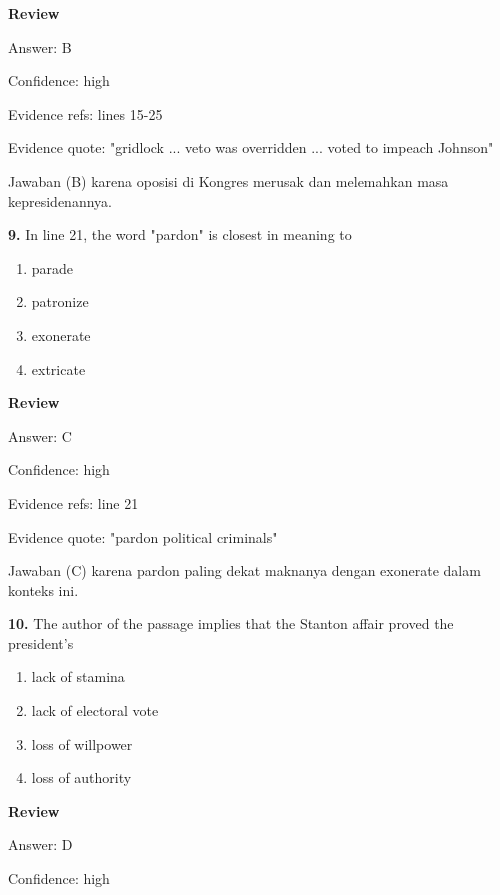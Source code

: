 \documentclass[12pt]{article}
\begin{document}
\begingroup
\setlength{\parskip}{0pt}
\setlength{\parindent}{0pt}
\textbf{Review}\par
Answer: B\par
Confidence: high\par
Evidence refs: lines 15-25\par
Evidence quote: "gridlock ... veto was overridden ... voted to impeach Johnson"\par
Jawaban (B) karena oposisi di Kongres merusak dan melemahkan masa kepresidenannya.\par
\endgroup
\par
\vspace{0.25\baselineskip}
\noindent\textbf{9.} In line 21, the word "pardon" is closest in meaning to
\begin{enumerate}[label=(\Alph*),leftmargin=*,itemsep=0.2em]
\item parade
\item patronize
\item exonerate
\item extricate
\end{enumerate}
\par
\begingroup
\setlength{\parskip}{0pt}
\setlength{\parindent}{0pt}
\textbf{Review}\par
Answer: C\par
Confidence: high\par
Evidence refs: line 21\par
Evidence quote: "pardon political criminals"\par
Jawaban (C) karena pardon paling dekat maknanya dengan exonerate dalam konteks ini.\par
\endgroup
\par
\vspace{0.25\baselineskip}
\noindent\textbf{10.} The author of the passage implies that the Stanton affair proved the president's
\begin{enumerate}[label=(\Alph*),leftmargin=*,itemsep=0.2em]
\item lack of stamina
\item lack of electoral vote
\item loss of willpower
\item loss of authority
\end{enumerate}
\par
\begingroup
\setlength{\parskip}{0pt}
\setlength{\parindent}{0pt}
\textbf{Review}\par
Answer: D\par
Confidence: high\par
\end{document}
